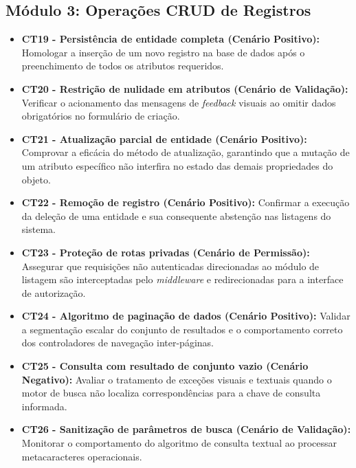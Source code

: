 \documentclass[12pt,a4paper]{article}
\begin{document}
\subsection{Módulo 3: Operações CRUD de Registros}
\begin{itemize}[leftmargin=*]
    \item \textbf{CT19 - Persistência de entidade completa (Cenário Positivo):} Homologar a inserção de um novo registro na base de dados após o preenchimento de todos os atributos requeridos.
    \item \textbf{CT20 - Restrição de nulidade em atributos (Cenário de Validação):} Verificar o acionamento das mensagens de \textit{feedback} visuais ao omitir dados obrigatórios no formulário de criação.
    \item \textbf{CT21 - Atualização parcial de entidade (Cenário Positivo):} Comprovar a eficácia do método de atualização, garantindo que a mutação de um atributo específico não interfira no estado das demais propriedades do objeto.
    \item \textbf{CT22 - Remoção de registro (Cenário Positivo):} Confirmar a execução da deleção de uma entidade e sua consequente abstenção nas listagens do sistema.
    \item \textbf{CT23 - Proteção de rotas privadas (Cenário de Permissão):} Assegurar que requisições não autenticadas direcionadas ao módulo de listagem são interceptadas pelo \textit{middleware} e redirecionadas para a interface de autorização.
    \item \textbf{CT24 - Algoritmo de paginação de dados (Cenário Positivo):} Validar a segmentação escalar do conjunto de resultados e o comportamento correto dos controladores de navegação inter-páginas.
    \item \textbf{CT25 - Consulta com resultado de conjunto vazio (Cenário Negativo):} Avaliar o tratamento de exceções visuais e textuais quando o motor de busca não localiza correspondências para a chave de consulta informada.
    \item \textbf{CT26 - Sanitização de parâmetros de busca (Cenário de Validação):} Monitorar o comportamento do algoritmo de consulta textual ao processar metacaracteres operacionais.
\end{itemize}
\end{document}
